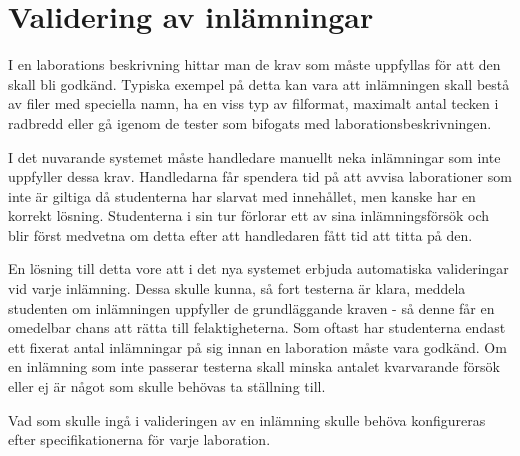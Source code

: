\section{Validering av inlämningar}

I en laborations beskrivning hittar man de krav som måste uppfyllas för att den skall bli godkänd. Typiska exempel på detta kan vara att inlämningen skall bestå av filer med speciella namn, ha en viss typ av filformat, maximalt antal tecken i radbredd eller gå igenom de tester som bifogats med laborationsbeskrivningen.

I det nuvarande systemet måste handledare manuellt neka inlämningar som inte uppfyller dessa krav. Handledarna får spendera tid på att avvisa laborationer som inte är giltiga då studenterna har slarvat med innehållet, men kanske har en korrekt lösning. Studenterna i sin tur förlorar ett av sina inlämningsförsök och blir först medvetna om detta efter att handledaren fått tid att titta på den.

En lösning till detta vore att i det nya systemet erbjuda automatiska valideringar vid varje inlämning. Dessa skulle kunna, så fort testerna är klara, meddela studenten om inlämningen uppfyller de grundläggande kraven - så denne får en omedelbar chans att rätta till felaktigheterna. Som oftast har studenterna endast ett fixerat antal inlämningar på sig innan en laboration måste vara godkänd. Om en inlämning som inte passerar testerna skall minska antalet kvarvarande försök eller ej är något som skulle behövas ta ställning till.

Vad som skulle ingå i valideringen av en inlämning skulle behöva konfigureras efter specifikationerna för varje laboration. 
